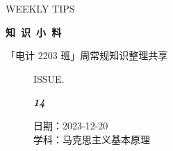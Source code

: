 \documentclass[UTF8]{ctexart}
\newcommand\Black[1]{\textcolor[gray]{0.3}{#1}}
\newcommand\Brown[1]{\textcolor[HTML]{998A4E}{#1}}
\newcommand\IssueNumber{14}
\newcommand\Date{2023-12-20}
\newcommand\Subject{马克思主义基本原理}
\begin{document}
\BgThispage
\begin{center}
{\scriptsize\Issue \textcolor[HTML]{C8BA83}{WEEKLY TIPS}}

{\Huge\bfseries\TitleFont \Black{知\ 识\ 小\ 料}}

\vspace{-0.1cm}
{\footnotesize \Brown{「电计 2203 班」周常规知识整理共享}}
\end{center}

\vspace{-0.5cm}

\begin{figure}[H]
\hspace{1cm}
\begin{minipage}[t]{0.3\textwidth}
\centering
    \Brown{ISSUE.}

    \vspace{-0.6cm}
    \Huge \Issue\slshape\bfseries\Black{\IssueNumber}
\end{minipage}
\hfill
\begin{minipage}[t]{0.35\textwidth}
\centering
    \Brown{日期：\Date} \\
\vspace{-0.1cm}
    \Brown{学科：\Subject} \\
\end{minipage}
\hspace{0.8cm}
\end{figure}
\end{document}
